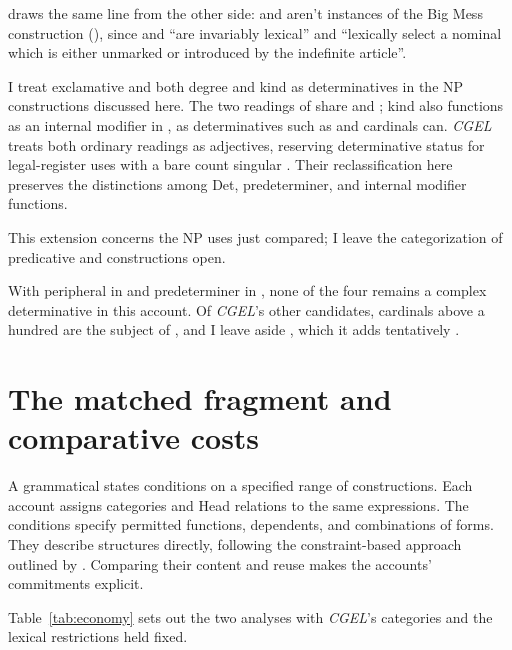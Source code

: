 \documentclass[12pt]{article}
\begin{document}
\textcite[§5]{VanEynde_2007_BigMess} draws the same line from the other side:  and  aren't instances of the Big Mess construction (), since  and  \enquote{are invariably lexical} and \enquote{lexically select a nominal which is either unmarked or introduced by the indefinite article}.

I treat exclamative  and both degree and kind  as determinatives in the NP constructions discussed here. The two readings of  share  and ; kind  also functions as an internal modifier in , as determinatives such as  and cardinals can. \textit{CGEL} treats both ordinary readings as adjectives, reserving determinative status for legal-register uses with a bare count singular \citep[435 and n.~52]{huddleston2002}. Their reclassification here preserves the distinctions among Det, predeterminer, and internal modifier functions.

This extension concerns the NP uses just compared; I leave the categorization of predicative  and  constructions open.

With peripheral  in  and predeterminer  in , none of the four remains a complex determinative in this account. Of \textit{CGEL}'s other candidates, cardinals above a hundred are the subject of \textcite{reynolds2026numerals}, and I leave aside , which it adds tentatively \citep[393]{huddleston2002}.

\section{The matched fragment and comparative costs}\label{sec:economy}

A grammatical  states conditions on a specified range of constructions. Each account assigns categories and Head relations to the same expressions. The conditions specify permitted functions, dependents, and combinations of forms. They describe structures directly, following the constraint-based approach outlined by \textcite{pullum2020theorizing}. Comparing their content and reuse makes the accounts' commitments explicit.

Table~\ref{tab:economy} sets out the two analyses with \textit{CGEL}'s categories and the lexical restrictions held fixed.
\end{document}
